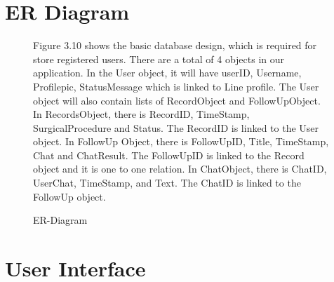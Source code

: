 \documentclass[12pt,oneside,openright,a4paper]{cpe-english-project}
\begin{document}
  \section{ER Diagram}
    \begin{figure}[!h]
      \centering
      \caption{ER-Diagram}\label{fig:ER}
      \begin{flushleft}
        \qquad Figure 3.10 shows the basic database design, which is required for store registered users. There are a total of 4 objects in our application. In the User object, it will have userID, Username, Profilepic, StatusMessage which is linked to Line profile. The User object will also contain  lists of RecordObject and FollowUpObject. In RecordsObject, there is RecordID, TimeStamp, SurgicalProcedure and Status. The RecordID is linked to the User object.  In FollowUp Object, there is FollowUpID, Title, TimeStamp, Chat and ChatResult. The FollowUpID is linked to the Record object and it is one to one relation. In ChatObject, there is ChatID, UserChat, TimeStamp, and Text. The ChatID is linked to the FollowUp object. \par
      \end{flushleft}
    \end{figure}
\newpage
  \section{User Interface}
\end{document}
